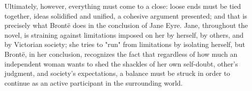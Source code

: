 \documentclass[a4paper,12pt]{article}
\begin{document}
\begin{flushleft}
        Ultimately, however, everything must come to a close: loose ends must be tied together,
        ideas solidified and unified, a cohesive argument presented; and that is precisely what
        Brontë does in the conclusion of Jane Eyre. Jane, throughout the novel, is straining against
        limitations imposed on her by herself, by others, and by Victorian society; she tries to
        "run" from limitations by isolating herself, but Brontë, in her conclusion, recognizes the
        fact that regardless of how much an independent woman wants to shed the shackles of her own
        self-doubt, other’s judgment, and society’s expectations, a balance must be struck in order
        to continue as an active participant in the surrounding world.
    \end{flushleft}
\end{document}
